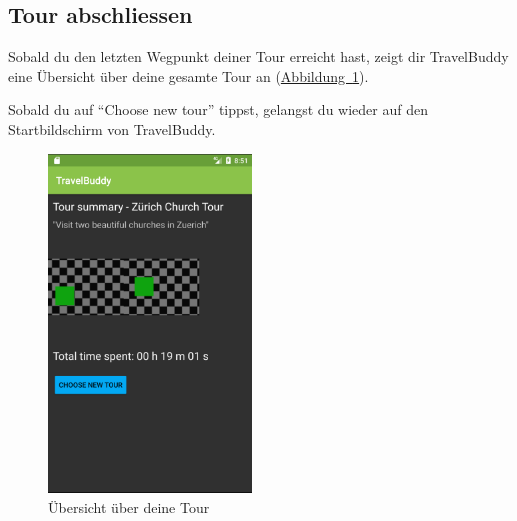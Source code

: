 \documentclass[a4paper,10pt,xetex]{article}
\begin{document}
\newpage
\subsection{Tour abschliessen}
Sobald du den letzten Wegpunkt deiner Tour erreicht hast, zeigt dir TravelBuddy eine
Übersicht über deine gesamte Tour an (\hyperref[fig:summary-activity]{Abbildung~\ref*{fig:summary-activity}}).

Sobald du auf ``Choose new tour'' tippst, gelangst du wieder auf den Startbildschirm von TravelBuddy.

\begin{figure}
  \centering
  \includegraphics[width=0.48\textwidth]{screenshots/SummaryActivity}
  \caption{Übersicht über deine Tour}
  \label{fig:summary-activity}
\end{figure}
\end{document}
